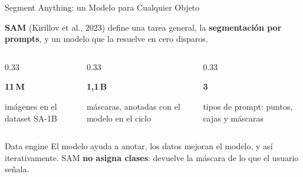 \documentclass[aspectratio=169, 10pt]{beamer}
\newcommand{\cifra}[2]{%
	\begin{center}
		{\fontsize{30}{32}\selectfont\bfseries\color{UCMNavy}#1}\\[4pt]
		\parbox{0.95\linewidth}{\centering\small #2}
	\end{center}
}
\begin{document}
\begin{frame}{Segment Anything: un Modelo para Cualquier Objeto}

	\textbf{SAM} (Kirillov et al., 2023) define una tarea general, la \textbf{segmentaci\'on por prompts}, y un modelo que la resuelve en cero disparos.

	\vspace{0.4cm}

	\begin{columns}[T]
		\begin{column}{0.33\textwidth}
			\cifra{11\,M}{im\'agenes en el dataset SA-1B}
		\end{column}
		\begin{column}{0.33\textwidth}
			\cifra{1{,}1\,B}{m\'ascaras, anotadas con el modelo en el ciclo}
		\end{column}
		\begin{column}{0.33\textwidth}
			\cifra{3}{tipos de prompt: puntos, cajas y m\'ascaras}
		\end{column}
	\end{columns}

	\vspace{0.3cm}

	\begin{block}{Data engine}
		El modelo ayuda a anotar, los datos mejoran el modelo, y as\'i iterativamente. SAM \textbf{no asigna clases}: devuelve la m\'ascara de lo que el usuario se\~nala.
	\end{block}

\end{frame}
\end{document}
